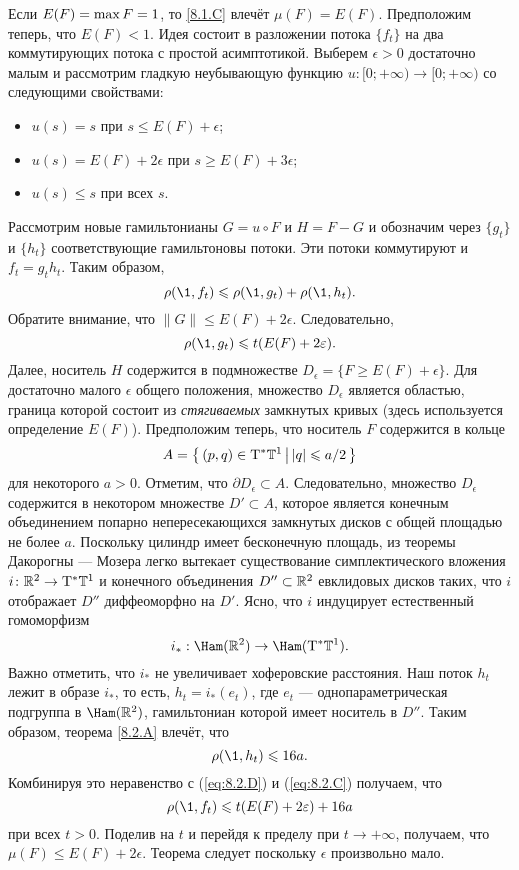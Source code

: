 Если $E (F) \z= \max F = 1$, то \ref{8.1.C} влечёт $\mu (F) = E (F)$.
Предположим теперь, что $E (F) <1$.
Идея состоит в разложении потока $\{f_t\}$ на два
коммутирующих потока с простой асимптотикой. 
Выберем $\epsilon> 0$ достаточно малым и рассмотрим гладкую
неубывающую функцию $u: [0; + \infty) \to [0; + \infty)$ со следующими
    свойствами:  
\begin{itemize}
\item $u (s) = s$ при $s \le E (F) + \epsilon$;
\item $u (s) = E (F) + 2\epsilon$ при $s \ge E (F) + 3\epsilon$;
\item $u (s) \le s$ при всех $s$.
\end{itemize}
Рассмотрим новые гамильтонианы $G = u \circ F$ и $H = F - G$ и
обозначим через $\{g_t\}$ и $\{h_t\}$ соответствующие гамильтоновы
потоки. 
Эти потоки коммутируют и $f_t = g_t h_t$. 
Таким образом, 
\begin{equation}\rho (\1, f_t) \le \rho (\1, g_t) + \rho (\1, h_t).
\label{eq:8.2.C}
\end{equation}
Обратите внимание, что $\| G \| \le E (F) + 2\epsilon$.
Следовательно, 
\begin{equation}
 \rho (\1, g_t) \le t (E (F) + 2\epsilon).
\label{eq:8.2.D}
\end{equation}
Далее, носитель $H$ содержится в подмножестве $D_\epsilon = \{F \ge E
(F) + \epsilon\}$. 
Для достаточно малого $\epsilon$ общего положения, множество
$D_\epsilon$ является областью, граница которой состоит из {}\emph{стягиваемых}
замкнутых кривых (здесь используется определение $E(F)$). 
Предположим теперь, что носитель $F$ содержится в кольце 
\[A = \left\{ \,{(p, q) \in \mathrm{T}^\ast\mathbb{T}^1}\, \middle| \,{| q | \leqslant a / 2}\, \right\}\]
для некоторого $a> 0$. 
Отметим, что $\partial D_\epsilon \subset A$.
Следовательно, множество $D_\epsilon$ содержится в некотором множестве
$D' \subset A$, которое является конечным объединением попарно
непересекающихся замкнутых дисков с общей площадью не более $a$. 
Поскольку цилиндр имеет бесконечную площадь, из теоремы
Дакорогны — Мозера \cite[1.6]{HZ} легко вытекает существование симплектического вложения $i\colon \mathbb{R}^2 \to\mathrm{T}^\ast \mathbb{T}^1$ и конечного объединения $D'' \subset \mathbb{R}^2$ евклидовых дисков таких, что $i$
отображает $D''$ диффеоморфно на $D'$. 
Ясно, что $i$ индуцирует естественный гомоморфизм 
\[i_\ast: \Ham (\RR^2) \to \Ham (\T^\ast \TT^1).\]
Важно отметить, что $i_\ast$ не увеличивает хоферовские расстояния.
Наш поток $h_t$ лежит в образе $i_\ast$, то есть, $h_t = i_\ast (e_{t})$,
где $e_{t}$ — однопараметрическая подгруппа в $\Ham (\RR^2)$,
гамильтониан которой имеет носитель в $D''$. 
Таким образом, теорема \ref{8.2.A} влечёт, что 
\[
\rho (\1, h_t) \le 16a.
\]
Комбинируя это неравенство с (\ref{eq:8.2.D}) и (\ref{eq:8.2.C}) получаем, что
\begin{equation}
  \rho (\1, f_t) \le t (E (F) + 2\epsilon) + 16a 
  \label{eq:8.2.E} 
\end{equation}
при всех $t> 0$.
Поделив на $t$ и перейдя к пределу при $t \to +\infty$, получаем, что
$\mu (F) \le E (F) + 2\epsilon$. 
Теорема следует поскольку $\epsilon$ произвольно мало.
\qeds

